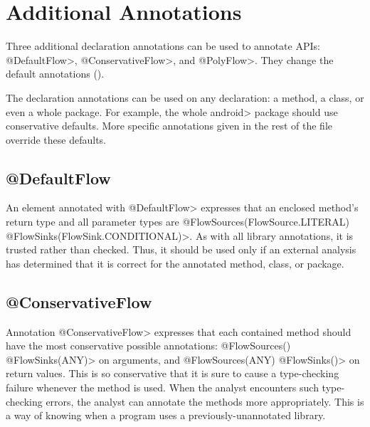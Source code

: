 


\section{Additional Annotations\label{sec:addtionalanno}}

Three additional declaration annotations can be used to annotate APIs:
\<@DefaultFlow>, \<@ConservativeFlow>, and \<@PolyFlow>. 
They change the default annotations ().
 
The declaration annotations can be used on any declaration: a method,
a class, or even a whole package.
For example, the
whole \<android> package should use conservative defaults.
More specific annotations given in the rest of the file override these
defaults.


\subsection{@DefaultFlow}

An element annotated with \<@DefaultFlow> expresses that an enclosed
method's return type and all parameter types are \<@FlowSources(FlowSource.LITERAL)
@FlowSinks(FlowSink.CONDITIONAL)>.  As with all 
library annotations, it is trusted rather than checked.  Thus, it should be
used only if an external analysis has determined that it is correct for the
annotated method, class, or package.




\subsection{@ConservativeFlow}

Annotation \<@ConservativeFlow> expresses that each contained method
should have the most conservative possible annotations:
  \<@FlowSources({}) @FlowSinks(ANY)> on arguments, and
  \<@FlowSources(ANY) @FlowSinks({})> on return values.
This is so conservative that it is sure to cause a type-checking failure
whenever the method is used.
When the analyst encounters such type-checking errors, the analyst can
annotate the methods more appropriately.  This is a way of knowing when a
program uses a previously-unannotated library.


